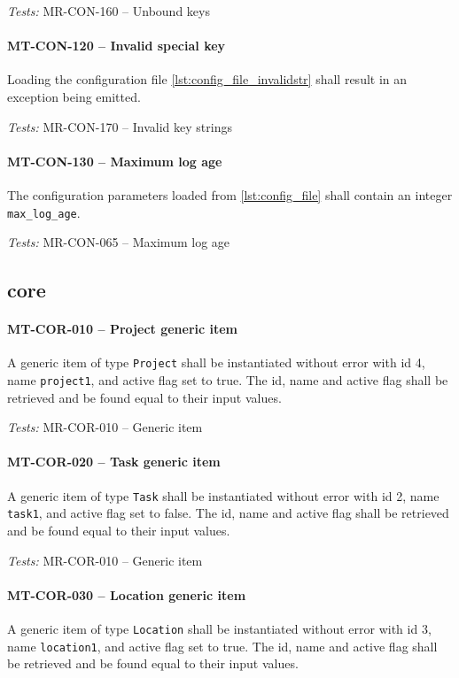 \textit{Tests: } MR-CON-160 -- Unbound keys

\paragraph{MT-CON-120 -- Invalid special key}
Loading the configuration file \cref{lst:config_file_invalidstr} shall
result in an exception being emitted.

\textit{Tests: } MR-CON-170 -- Invalid key strings

\paragraph{MT-CON-130 -- Maximum log age}
The configuration parameters loaded from \cref{lst:config_file}
shall contain an integer \lstinline{max_log_age}.

\textit{Tests: } MR-CON-065 -- Maximum log age

\subsection{core}
\paragraph{MT-COR-010 -- Project generic item}
A generic item of type \lstinline{Project} shall be instantiated without
error with id 4, name \lstinline{project1}, and active flag set to true.
The id, name and active flag shall be retrieved and be found equal to
their input values.

\textit{Tests: } MR-COR-010 -- Generic item

\paragraph{MT-COR-020 -- Task generic item}
A generic item of type \lstinline{Task} shall be instantiated without
error with id 2, name \lstinline{task1}, and active flag set to false.
The id, name and active flag shall be retrieved and be found equal to
their input values.

\textit{Tests: } MR-COR-010 -- Generic item

\paragraph{MT-COR-030 -- Location generic item}
A generic item of type \lstinline{Location} shall be instantiated without
error with id 3, name \lstinline{location1}, and active flag set to true.
The id, name and active flag shall be retrieved and be found equal to
their input values.

